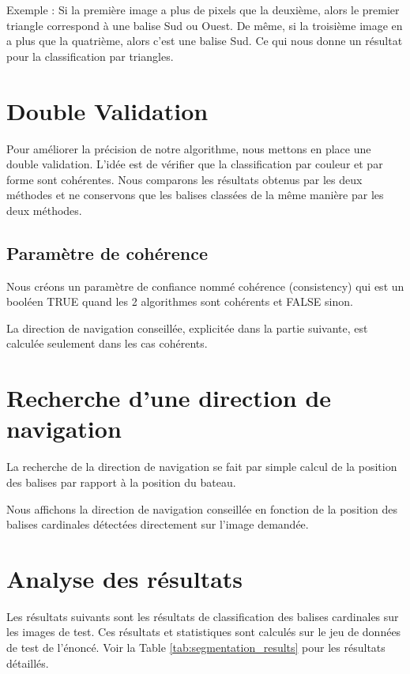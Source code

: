 \documentclass{article}
\begin{document}
Exemple : Si la première image a plus de pixels que la deuxième, alors le
premier triangle correspond à une balise Sud ou Ouest. De même, si la troisième
image en a plus que la quatrième, alors c’est une balise Sud. Ce qui nous donne
un résultat pour la classification par triangles.

\section{Double Validation}

Pour améliorer la précision de notre algorithme, nous mettons en place une
double validation. L'idée est de vérifier que la classification par couleur et
par forme sont cohérentes. Nous comparons les résultats obtenus par les deux
méthodes et ne conservons que les balises classées de la même manière par les
deux méthodes.

\subsection{Paramètre de cohérence}
Nous créons un paramètre de confiance nommé cohérence (consistency) qui est un
booléen TRUE quand les 2 algorithmes sont cohérents et FALSE sinon.

La direction de navigation conseillée, explicitée dans la partie suivante, est
calculée seulement dans les cas cohérents.

\section{Recherche d'une direction de navigation}

La recherche de la direction de navigation se fait par simple calcul de la
position des balises par rapport à la position du bateau.

Nous affichons la direction de navigation conseillée en fonction de la position
des balises cardinales détectées directement sur l'image demandée.

\section{Analyse des résultats}

Les résultats suivants sont les résultats de classification des balises
cardinales sur les images de test. Ces résultats et statistiques sont calculés
sur le jeu de données de test de l'énoncé. Voir la Table \ref{tab:segmentation_results} pour les résultats détaillés.
\end{document}
